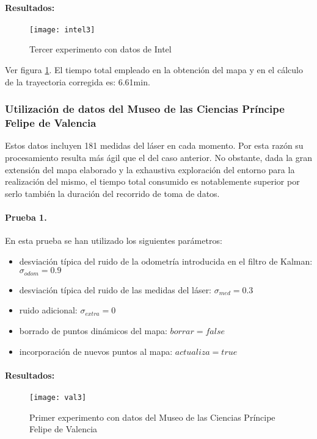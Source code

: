 \paragraph{Resultados:} 

\begin{figure}[hbtp]
  \centering\texttt{[image: intel3]}\\
  \caption{Tercer experimento con datos de Intel}\label{fg:intel3}
\end{figure}

Ver figura \ref{fg:intel3}. El tiempo total empleado en la obtención del mapa y en el cálculo de la trayectoria corregida es: 6.61min.

\clearpage
\subsubsection{Utilización de datos del Museo de las Ciencias Príncipe Felipe de Valencia}

Estos datos incluyen 181 medidas del láser en cada momento. Por esta razón su procesamiento resulta más ágil que el del caso anterior. No obstante, dada la gran extensión del mapa elaborado y la exhaustiva exploración del entorno para la realización del mismo, el tiempo total consumido es notablemente superior por serlo también la duración del recorrido de toma de datos.

\paragraph{Prueba 1.}
En esta prueba se han utilizado los siguientes parámetros:
\begin{itemize}
  \item desviación típica del ruido de la odometría introducida en el filtro de Kalman: $\sigma_{odom} = 0.9$
  \item desviación típica del ruido de las medidas del láser: $\sigma_{med} = 0.3$
  \item ruido adicional: $\sigma_{extra} = 0$
  \item borrado de puntos dinámicos del mapa: $borrar = false$
  \item incorporación de nuevos puntos al mapa: $actualiza = true$
\end{itemize}


\paragraph{Resultados:} 
\begin{figure}[h]
  \centering\texttt{[image: val3]}\\
  \caption{Primer experimento con datos del Museo de las Ciencias Príncipe Felipe de Valencia}\label{fg:val3}
\end{figure}

